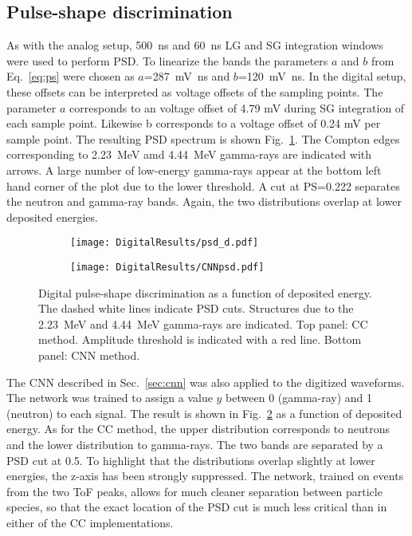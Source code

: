 \documentclass[main.tex]{subfiles}
\begin{document}
\subsection{Pulse-shape discrimination}
As with the analog setup, \SI{500}{ns} and \SI{60}{ns} LG and SG integration windows were used to perform PSD.  To linearize the bands the parameters $a$ and $b$ from Eq.~\ref{eq:ps} were chosen as $a$=\SI{287}{\mV\ns} and $b$=\SI{120}{\mV\ns}. In the digital setup, these offsets can be interpreted as voltage offsets of the sampling points. The parameter $a$ corresponds to an voltage offset of 4.79 mV during SG integration of each sample point. Likewise b corresponds to a voltage offset of 0.24 mV per sample point.
The resulting PSD spectrum is shown Fig.~\ref{fig:psd_d}. The Compton edges corresponding to \SI{2.23}{\MeV} amd \SI{4.44}{MeV} gamma-rays are indicated with arrows. A large number of low-energy gamma-rays appear at the bottom left hand corner of the plot due to the lower threshold.
A cut at PS=0.222 separates the neutron and gamma-ray bands. Again, the two distributions overlap at lower deposited energies.

\begin{figure}
    \centering
    \begin{subfigure}[ht]{\textwidth}
    	\centering
        \texttt{[image: DigitalResults/psd\_d.pdf]}
        \caption{}
        \label{fig:psd_d}
    \end{subfigure}
	\begin{subfigure}[ht]{\textwidth}
		\centering
        \texttt{[image: DigitalResults/CNNpsd.pdf]}
        \caption{}
    	\label{fig:cnn_E} 
    \end{subfigure}
        \caption[Digital pulse-shape discrimination as a function of deposited energy.]{Digital pulse-shape discrimination as a function of deposited energy. The dashed white lines indicate PSD cuts. Structures due to the \SI{2.23}{MeV} and \SI{4.44}{MeV} gamma-rays are indicated. Top panel: CC method. Amplitude threshold is indicated with a red line. Bottom panel: CNN method.}
    \label{fig:ccm_cnn}
\end{figure}

The CNN described in Sec.~\ref{sec:cnn} was also applied to the digitized waveforms. The network was trained to assign a value $y$ between 0 (gamma-ray) and 1 (neutron) to each signal. The result is shown in Fig.~\ref{fig:cnn_E} as a function of deposited energy. As for the CC method, the upper distribution corresponds to neutrons and the lower distribution to gamma-rays. The two bands are separated by a PSD cut at 0.5. To highlight that the distributions overlap slightly at lower energies, the z-axis has been strongly suppressed. The network, trained on events from the two ToF peaks, allows for much cleaner separation between particle species, so that the exact location of the PSD cut is much less critical than in either of the CC implementations.
\end{document}
